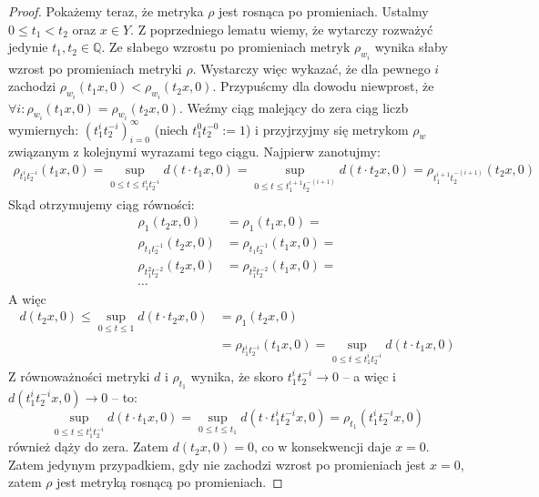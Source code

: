\begin{thm}
\begin{proof}
    Pokażemy teraz, że metryka $\rho$ jest rosnąca po promieniach. Ustalmy $0 \leq t_1 < t_2$ oraz $x \in Y$. Z poprzedniego lematu wiemy, że wytarczy rozważyć jedynie $t_1, t_2 \in \mathbb{Q}$. Ze słabego wzrostu po promieniach metryk $\rho_{w_i}$ wynika słaby wzrost po promieniach metryki $\rho$. Wystarczy więc wykazać, że dla pewnego $i$ zachodzi $\rho_{w_i}(t_1 x, 0) < \rho_{w_i}(t_2 x, 0)$. Przypuścmy dla dowodu niewprost, że $\forall i: \rho_{w_i}(t_1 x, 0) = \rho_{w_i}(t_2 x, 0)$. Weźmy ciąg malejący do zera ciąg liczb wymiernych: $(t_1^i t_2^{-i})_{i=0}^\infty$ (niech $t_1^0 t_2^{-0} := 1$) i przyjrzyjmy się metrykom $\rho_w$ związanym z kolejnymi wyrazami tego ciągu. Najpierw zanotujmy:
    \begin{align*}
      \rho_{t_1^i t_2^{-i}}(t_1 x, 0) = \sup_{0 \leq t \leq t_1^i t_2^{-i}} d(t \cdot t_1 x, 0) =
      \sup_{0 \leq t \leq t_1^{i+1} t_2^{-(i+1)}} d(t \cdot t_2 x, 0) = \rho_{t_1^{i+1} t_2^{-(i+1)}}(t_2 x, 0)
    \end{align*}
    Skąd otrzymujemy ciąg równości:
    \begin{align*}
      \rho_1(t_2 x, 0) &= \rho_1(t_1 x, 0) = \\
      \rho_{t_1 t_2^{-1}}(t_2 x, 0) &= \rho_{t_1 t_2^{-1}}(t_1 x, 0) = \\
      \rho_{t_1^2 t_2^{-2}}(t_2 x, 0) &= \rho_{t_1^2 t_2^{-2}}(t_1 x, 0) = \\
      \cdots
    \end{align*}
    A więc
    \begin{align*}
      d(t_2 x, 0) \leq \sup_{0 \leq t \leq 1} d(t \cdot t_2 x, 0) &= \rho_1(t_2 x, 0) \\
      &= \rho_{t_1^i t_2^{-i}}(t_1 x, 0) = \sup_{0 \leq t \leq t_1^i t_2^{-i}} d(t \cdot t_1 x, 0)
    \end{align*}
    Z równoważności metryki $d$ i $\rho_{t_1}$ wynika, że skoro $t_1^i t_2^{-i} \to 0$ -- a więc i $d(t_1^i t_2^{-i} x, 0) \to 0$ -- to:
    \[
      \sup_{0 \leq t \leq t_1^i t_2^{-i}} d(t \cdot t_1 x, 0)
      = \sup_{0 \leq t \leq t_1} d(t \cdot t_1^i t_2^{-i} x, 0)
      = \rho_{t_1}(t_1^i t_2^{-i} x, 0)
    \]
    również dąży do zera. Zatem $d(t_2 x, 0) = 0$, co w konsekwencji daje $x = 0$. Zatem jedynym przypadkiem, gdy nie zachodzi wzrost po promieniach jest $x = 0$, zatem $\rho$ jest metryką rosnącą po promieniach.
  \end{proof}
\end{thm}

